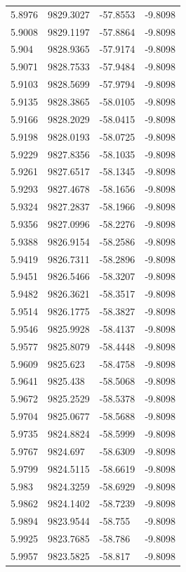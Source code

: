 \begin{table}[H]
\begin{tabular}{llll}
5.8976 & 9829.3027 & -57.8553 & -9.8098 \\
5.9008 & 9829.1197 & -57.8864 & -9.8098 \\
5.904 & 9828.9365 & -57.9174 & -9.8098 \\
5.9071 & 9828.7533 & -57.9484 & -9.8098 \\
5.9103 & 9828.5699 & -57.9794 & -9.8098 \\
5.9135 & 9828.3865 & -58.0105 & -9.8098 \\
5.9166 & 9828.2029 & -58.0415 & -9.8098 \\
5.9198 & 9828.0193 & -58.0725 & -9.8098 \\
5.9229 & 9827.8356 & -58.1035 & -9.8098 \\
5.9261 & 9827.6517 & -58.1345 & -9.8098 \\
5.9293 & 9827.4678 & -58.1656 & -9.8098 \\
5.9324 & 9827.2837 & -58.1966 & -9.8098 \\
5.9356 & 9827.0996 & -58.2276 & -9.8098 \\
5.9388 & 9826.9154 & -58.2586 & -9.8098 \\
5.9419 & 9826.7311 & -58.2896 & -9.8098 \\
5.9451 & 9826.5466 & -58.3207 & -9.8098 \\
5.9482 & 9826.3621 & -58.3517 & -9.8098 \\
5.9514 & 9826.1775 & -58.3827 & -9.8098 \\
5.9546 & 9825.9928 & -58.4137 & -9.8098 \\
5.9577 & 9825.8079 & -58.4448 & -9.8098 \\
5.9609 & 9825.623 & -58.4758 & -9.8098 \\
5.9641 & 9825.438 & -58.5068 & -9.8098 \\
5.9672 & 9825.2529 & -58.5378 & -9.8098 \\
5.9704 & 9825.0677 & -58.5688 & -9.8098 \\
5.9735 & 9824.8824 & -58.5999 & -9.8098 \\
5.9767 & 9824.697 & -58.6309 & -9.8098 \\
5.9799 & 9824.5115 & -58.6619 & -9.8098 \\
5.983 & 9824.3259 & -58.6929 & -9.8098 \\
5.9862 & 9824.1402 & -58.7239 & -9.8098 \\
5.9894 & 9823.9544 & -58.755 & -9.8098 \\
5.9925 & 9823.7685 & -58.786 & -9.8098 \\
5.9957 & 9823.5825 & -58.817 & -9.8098 \\

\end{tabular}
\end{table}

